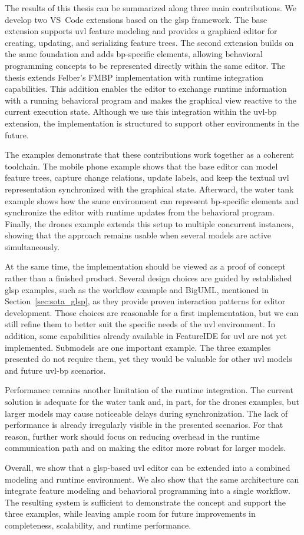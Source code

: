 The results of this thesis can be summarized along three main contributions.
We develop two VS~Code extensions based on the \gls{glsp} framework.
The base extension supports \gls{uvl} feature modeling and provides a graphical editor for creating, updating, and serializing feature trees.
The second extension builds on the same foundation and adds \gls{bp}-specific elements, allowing behavioral programming concepts to be represented directly within the same editor.
The thesis extends Felber's FMBP implementation with runtime integration capabilities.
This addition enables the editor to exchange runtime information with a running behavioral program and makes the graphical view reactive to the current execution state.
Although we use this integration within the \gls{uvl}-\gls{bp} extension, the implementation is structured to support other environments in the future.

The examples demonstrate that these contributions work together as a coherent toolchain.
The mobile phone example shows that the base editor can model feature trees, capture change relations, update labels, and keep the textual \gls{uvl} representation synchronized with the graphical state.
Afterward, the water tank example shows how the same environment can represent \gls{bp}-specific elements and synchronize the editor with runtime updates from the behavioral program.
Finally, the drones example extends this setup to multiple concurrent instances, showing that the approach remains usable when several models are active simultaneously.

At the same time, the implementation should be viewed as a proof of concept rather than a finished product.
Several design choices are guided by established \gls{glsp} examples, such as the workflow example and BigUML, mentioned in Section~\ref{sec:sota_glsp}, as they provide proven interaction patterns for editor development.
Those choices are reasonable for a first implementation, but we can still refine them to better suit the specific needs of the \gls{uvl} environment.
In addition, some capabilities already available in FeatureIDE for \gls{uvl} are not yet implemented.
Submodels are one important example.
The three examples presented do not require them, yet they would be valuable for other \gls{uvl} models and future \gls{uvl}-\gls{bp} scenarios.

Performance remains another limitation of the runtime integration.
The current solution is adequate for the water tank and, in part, for the drones examples, but larger models may cause noticeable delays during synchronization.
The lack of performance is already irregularly visible in the presented scenarios.
For that reason, further work should focus on reducing overhead in the runtime communication path and on making the editor more robust for larger models.

Overall, we show that a \gls{glsp}-based \gls{uvl} editor can be extended into a combined modeling and runtime environment.
We also show that the same architecture can integrate feature modeling and behavioral programming into a single workflow.
The resulting system is sufficient to demonstrate the concept and support the three examples, while leaving ample room for future improvements in completeness, scalability, and runtime performance.